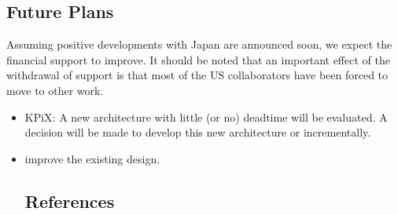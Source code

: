 \subsection{Future Plans}
Assuming positive developments with Japan are announced soon, we expect the financial support to improve. It should be noted that
an important effect of the withdrawal of support is that most of the US collaborators have been forced to move to other work.
\begin{itemize}


	\item KPiX: A new architecture with little (or no) deadtime will be evaluated. A decision will be made to develop this new architecture or incrementally.
	\item improve the existing design.
\subsection{References}
\\
\\
\\
\end{itemize}
